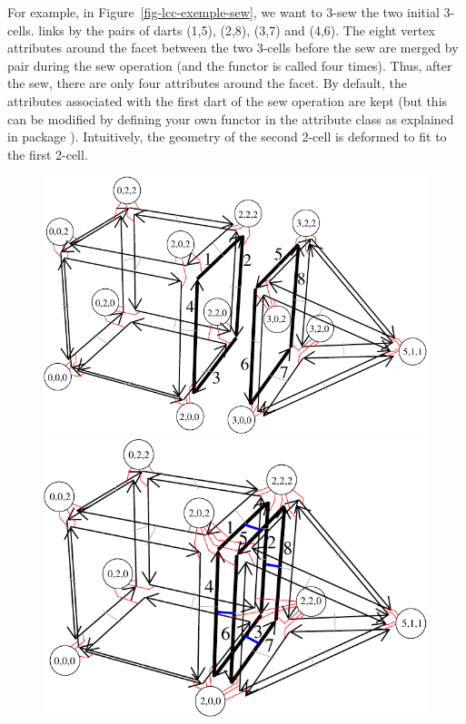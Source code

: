 For example, in Figure~\ref{fig-lcc-exemple-sew}, we want to 3-sew the
two initial 3-cells.  links by \betatrois{} the pairs
of darts (1,5), (2,8), (3,7) and (4,6). The eight vertex attributes
around the facet between the two 3-cells before the sew are merged by
pair during the sew operation (and the  functor is
called four times). Thus, after the sew, there are only four
attributes around the facet. By default, the attributes associated
with the first dart of the sew operation are kept (but this can be
modified by defining your own functor in the attribute class as
explained in package ). Intuitively, the
geometry of the second 2-cell is deformed to fit to the first 2-cell.
%
\def\LargFig{.45\textwidth}
\begin{figure}
  \begin{ccTexOnly}
    \begin{center}
      \includegraphics[width=\LargFig]{Linear_cell_complex/fig/pdf/exemple-carte-with_point_3d-sew}\qquad
      \includegraphics[width=\LargFig]{Linear_cell_complex/fig/pdf/exemple-carte-with_point_3d-sew2}

\end{center}
\end{ccTexOnly}
\end{figure}
